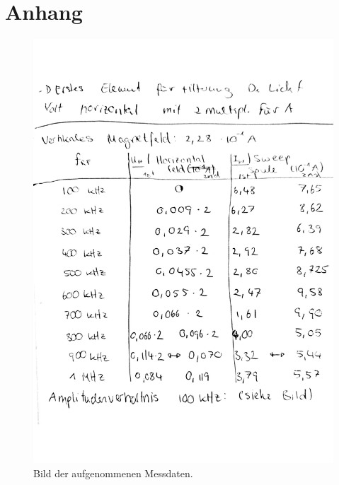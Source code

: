 \chapter*{Anhang}
\label{cha:Messdaten}


\begin{figure}[H]
              \centering
              \includegraphics[height=\textheight]{content/v21_bilder/messdaten.pdf}
              \caption{Bild der aufgenommenen Messdaten.}
              \label{fig:messdaten}
\end{figure}